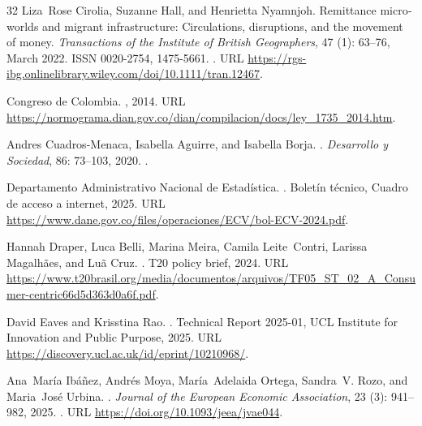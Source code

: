 \documentclass[12pt]{article}
\begin{document}
\begin{thebibliography}{32}
Liza~Rose Cirolia, Suzanne Hall, and Henrietta Nyamnjoh.
\newblock Remittance micro‐worlds and migrant infrastructure: {Circulations}, disruptions, and the movement of money.
\newblock \emph{Transactions of the Institute of British Geographers}, 47 (1): 63--76, March 2022.
\newblock ISSN 0020-2754, 1475-5661.
\newblock {}.
\newblock URL \url{https://rgs-ibg.onlinelibrary.wiley.com/doi/10.1111/tran.12467}.

{Congreso de Colombia}.
, 2014.
\newblock URL \url{https://normograma.dian.gov.co/dian/compilacion/docs/ley_1735_2014.htm}.

Andres Cuadros-Menaca, Isabella Aguirre, and Isabella Borja.
.
\newblock \emph{Desarrollo y Sociedad}, 86: 73--103, 2020.
\newblock {}.

{Departamento Administrativo Nacional de Estadística}.
.
\newblock Boletín técnico, Cuadro de acceso a internet, 2025.
\newblock URL \url{https://www.dane.gov.co/files/operaciones/ECV/bol-ECV-2024.pdf}.

Hannah Draper, Luca Belli, Marina Meira, Camila Leite~Contri, Larissa Magalhães, and Luã Cruz.
.
\newblock T20 policy brief, 2024.
\newblock URL \url{https://www.t20brasil.org/media/documentos/arquivos/TF05_ST_02_A_Consumer-centric66d5d363d0a6f.pdf}.

David Eaves and Krisstina Rao.
.
\newblock Technical Report 2025-01, UCL Institute for Innovation and Public Purpose, 2025.
\newblock URL \url{https://discovery.ucl.ac.uk/id/eprint/10210968/}.

Ana~María Ibáñez, Andrés Moya, María~Adelaida Ortega, Sandra~V. Rozo, and Maria~José Urbina.
.
\newblock \emph{Journal of the European Economic Association}, 23 (3): 941--982, 2025.
\newblock {}.
\newblock URL \url{https://doi.org/10.1093/jeea/jvae044}.


\end{thebibliography}
\end{document}
